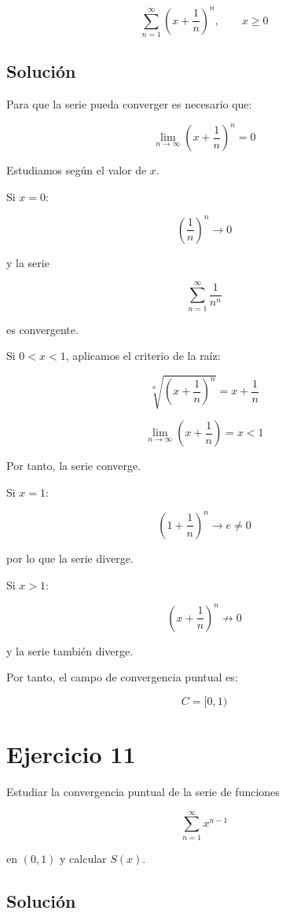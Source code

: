 \documentclass[fleqn]{article}
\begin{document}
	\[
	\sum_{n=1}^{\infty}
	\left(
	x+\frac{1}{n}
	\right)^n,
	\qquad x\geq 0
	\]

	\subsection{Solución}

	Para que la serie pueda converger es necesario que:

	\[
	\lim_{n\to\infty}
	\left(
	x+\frac{1}{n}
	\right)^n
	=
	0
	\]

	Estudiamos según el valor de $x$.

	Si $x=0$:

	\[
	\left(
	\frac{1}{n}
	\right)^n
	\longrightarrow 0
	\]

	y la serie

	\[
	\sum_{n=1}^{\infty}
	\frac{1}{n^n}
	\]

	es convergente.

	Si $0<x<1$, aplicamos el criterio de la raíz:

	\[
	\sqrt[n]{
	\left(
	x+\frac{1}{n}
	\right)^n
	}
	=
	x+\frac{1}{n}
	\]

	\[
	\lim_{n\to\infty}
	\left(
	x+\frac{1}{n}
	\right)
	=
	x<1
	\]

	Por tanto, la serie converge.

	Si $x=1$:

	\[
	\left(
	1+\frac{1}{n}
	\right)^n
	\longrightarrow e\neq0
	\]

	por lo que la serie diverge.

	Si $x>1$:

	\[
	\left(
	x+\frac{1}{n}
	\right)^n
	\not\longrightarrow0
	\]

	y la serie también diverge.

	Por tanto, el campo de convergencia puntual es:

	\[
	\boxed{
	C=[0,1)
	}
	\]

\section{Ejercicio 11}
	Estudiar la convergencia puntual de la serie de funciones

	\[
	\sum_{n=1}^{\infty}x^{n-1}
	\]

	en $(0,1)$ y calcular $S(x)$.

	\subsection{Solución}
\end{document}

